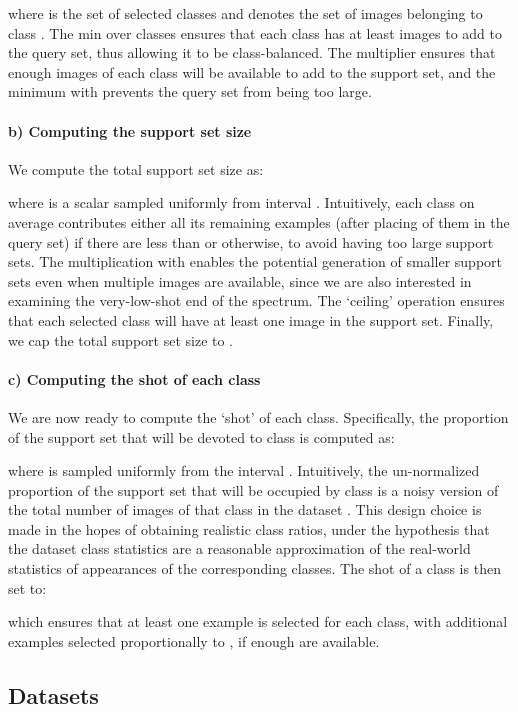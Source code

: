 \documentclass{article} \usepackage{iclr2020_conference,times}
\begin{document}
where  is the set of selected classes and  denotes the set
of images belonging to class . The min over classes ensures that each class
has at least  images to add to the query set, thus allowing it to be
class-balanced. The  multiplier ensures that enough images of each class
will be available to add to the support set, and the minimum with  prevents
the query set from being too large.

\paragraph{b) Computing the support set size} We compute the total support set size as:

where  is a scalar sampled uniformly from interval .
Intuitively, each class on average contributes either all its remaining
examples (after placing  of them in the query set) if there are less than
 or  otherwise, to avoid having too large support sets. The
multiplication with  enables the potential generation of smaller support
sets even when multiple images are available, since we are also interested in
examining the very-low-shot end of the spectrum. The `ceiling' operation
ensures that each selected class will have at least one image in the support
set. Finally, we cap the total support set size to .

\paragraph{c) Computing the shot of each class} We are now ready to compute the `shot' of each class. Specifically, the
proportion of the support set that will be devoted to class  is computed as:

where  is sampled uniformly from the interval .
Intuitively, the un-normalized proportion of the support set that will be
occupied by class  is a noisy version of the total number of images of that
class in the dataset . This design choice is made in the hopes of
obtaining realistic class ratios, under the hypothesis that the dataset class
statistics are a reasonable approximation of the real-world statistics of
appearances of the corresponding classes. The shot of a class  is then set
to:

which ensures that at least one example is selected for each class, with
additional examples selected proportionally to , if enough are available.


\subsection{Datasets}
\label{sec:appendix_datasets}
\end{document}

